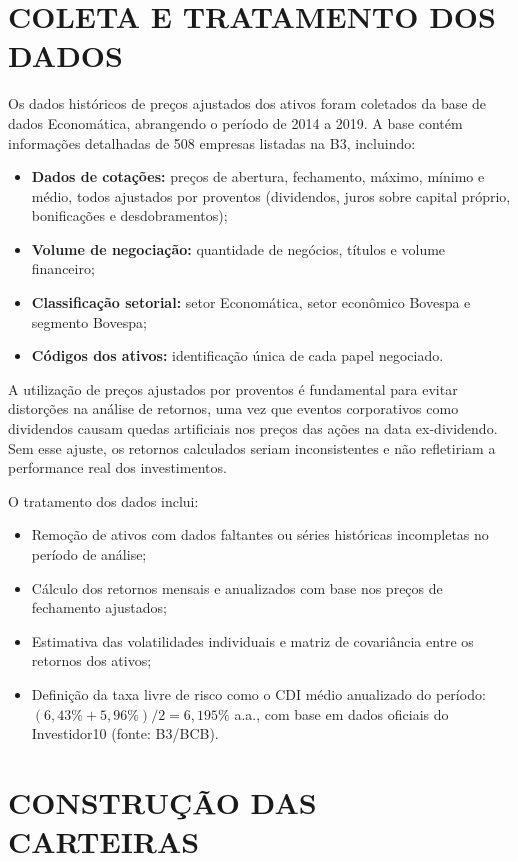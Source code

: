 \section{COLETA E TRATAMENTO DOS DADOS}

Os dados históricos de preços ajustados dos ativos foram coletados da base de dados Economática, abrangendo o período de 2014 a 2019. A base contém informações detalhadas de 508 empresas listadas na B3, incluindo:

\begin{itemize}
    \item \textbf{Dados de cotações:} preços de abertura, fechamento, máximo, mínimo e médio, todos ajustados por proventos (dividendos, juros sobre capital próprio, bonificações e desdobramentos);
    \item \textbf{Volume de negociação:} quantidade de negócios, títulos e volume financeiro;
    \item \textbf{Classificação setorial:} setor Economática, setor econômico Bovespa e segmento Bovespa;
    \item \textbf{Códigos dos ativos:} identificação única de cada papel negociado.
\end{itemize}

A utilização de preços ajustados por proventos é fundamental para evitar distorções na análise de retornos, uma vez que eventos corporativos como dividendos causam quedas artificiais nos preços das ações na data ex-dividendo. Sem esse ajuste, os retornos calculados seriam inconsistentes e não refletiriam a performance real dos investimentos.

O tratamento dos dados inclui:

\begin{itemize}
    \item Remoção de ativos com dados faltantes ou séries históricas incompletas no período de análise;
    \item Cálculo dos retornos mensais e anualizados com base nos preços de fechamento ajustados;
    \item Estimativa das volatilidades individuais e matriz de covariância entre os retornos dos ativos;
    \item Definição da taxa livre de risco como o CDI médio anualizado do período: $(6,43\% + 5,96\%)/2 = 6,195\%$ a.a., com base em dados oficiais do Investidor10 (fonte: B3/BCB).
\end{itemize}

\section{CONSTRUÇÃO DAS CARTEIRAS}

